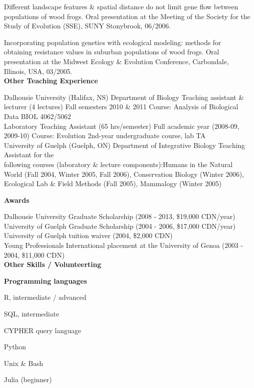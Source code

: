 \documentclass[a4paper,12pt,final]{memoir}
\newcommand{\Sep}{\vspace{1.5em}}
\newcommand{\SmallSep}{\vspace{0.5em}}
\newenvironment{Contact Information}
	{\ignorespaces\textbf{\color{MidnightBlue} Contact Information}}
	{\Sep\ignorespacesafterend}
\newcommand{\CVSection}[1]
	{\Large\textbf{#1}\par
	\SmallSep\normalsize\normalfont}
\newcommand{\CVItem}[1]
	{\textbf{\color{MidnightBlue} #1}}
\begin{document}
Different landscape features \& spatial distance do not limit gene flow between populations of wood frogs. Oral presentation at the Meeting of the Society for the Study of Evolution (SSE), SUNY Stonybrook, 06/2006.
\SmallSep

Incorporating population genetics with ecological modeling: methods for obtaining resistance values in suburban populations of wood frogs. Oral presentation at the Midwest Ecology \& Evolution Conference, Carbondale, Illinois, USA, 03/2005.\\


\CVSection{Other Teaching Experience}
Dalhousie University (Halifax, NS)
Department of Biology
Teaching assistant \& lecturer (4 lectures)
Fall semesters 2010 \& 2011
Course: Analysis of Biological Data BIOL 4062/5062\\ 

Laboratory Teaching Assistant (65 hrs/semester)
Full academic year (2008-09, 2009-10)
Course: Evolution 
2nd-year undergraduate course, lab TA\\ 

University of Guelph (Guelph, ON)
Department of Integrative Biology 
Teaching Assistant for the\\ following courses (laboratory \& lecture components):Humans in the Natural World (Fall 2004, Winter 2005, Fall 2006), Conservation Biology (Winter 2006), Ecological Lab \& Field Methods (Fall  2005), Mammalogy (Winter 2005)
\Sep


\CVSection{Awards}
Dalhousie University Graduate Scholarship (2008 - 2013, \$19,000 CDN/year)\\
University of Guelph Graduate Scholarship (2004 - 2006, \$17,000 CDN/year)\\
University of Guelph tuition waiver (2004, \$2,000 CDN)\\
Young Professionals International placement at the University of Genoa (2003 - 2004, \$11,000 CDN)\\


\CVSection{Other Skills / Volunteerting}


\CVItem{Programming languages}
\begin{multicols}{3}
\begin{compactitem}[\color{MidnightBlue}$\circ$]
	\item R, intermediate / advanced
    \item SQL, intermediate
    \item CYPHER query language
    \item Python
    \item Unix \& Bash
    \item Julia (beginner) 
\end{compactitem}
\end{multicols}
\Sep 
\end{document}
